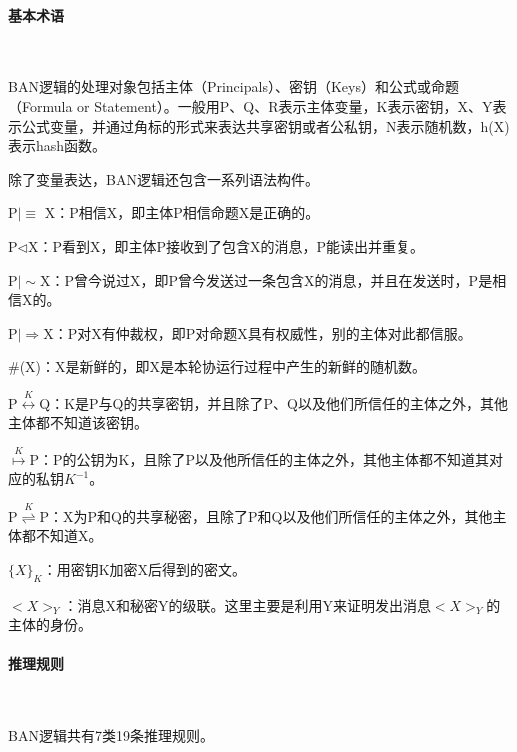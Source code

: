 \documentclass[cs4size,a4pape,UTF8]{ctexart}
\numberwithin{equation}{section}
\numberwithin{table}{section}
\numberwithin{figure}{section}
\begin{document}
\paragraph{基本术语}\

BAN逻辑的处理对象包括主体（Principals）、密钥（Keys）和公式或命题（Formula or Statement）。一般用P、Q、R表示主体变量，K表示密钥，X、Y表示公式变量，并通过角标的形式来表达共享密钥或者公私钥，N表示随机数，h(X)表示hash函数。

除了变量表达，BAN逻辑还包含一系列语法构件。

P$\lvert\equiv$ X：P相信X，即主体P相信命题X是正确的。

P$\triangleleft$X：P看到X，即主体P接收到了包含X的消息，P能读出并重复。

P$\lvert\sim$X：P曾今说过X，即P曾今发送过一条包含X的消息，并且在发送时，P是相信X的。

P$\lvert\Rightarrow$X：P对X有仲裁权，即P对命题X具有权威性，别的主体对此都信服。

\#(X)：X是新鲜的，即X是本轮协运行过程中产生的新鲜的随机数。

P$\stackrel{K}{\longleftrightarrow}$Q：K是P与Q的共享密钥，并且除了P、Q以及他们所信任的主体之外，其他主体都不知道该密钥。

$\stackrel{K}{\mapsto}$P：P的公钥为K，且除了P以及他所信任的主体之外，其他主体都不知道其对应的私钥$K^{-1}$。

P$\stackrel{K}{\rightleftharpoons}$P：X为P和Q的共享秘密，且除了P和Q以及他们所信任的主体之外，其他主体都不知道X。

$\{X\}_{K}$：用密钥K加密X后得到的密文。

$<X>_{Y}$：消息X和秘密Y的级联。这里主要是利用Y来证明发出消息$<X>_{Y}$的主体的身份。

\paragraph{推理规则}\

BAN逻辑共有7类19条推理规则。
\end{document}
